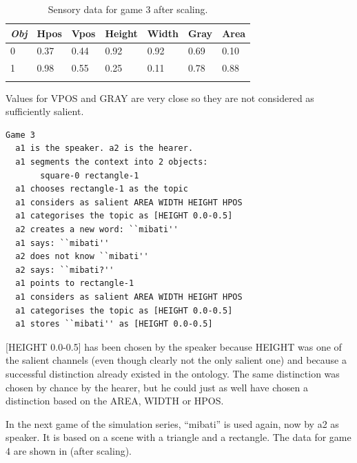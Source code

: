 \begin{table}
\begin{center}
\begin{tabular}{ l  l  l  l  l  l  l }
\lsptoprule
{\itshape Obj} & Hpos & Vpos & Height & Width & Gray & Area \\ \midrule
0 & 0.37 & 0.44 & 0.92 & 0.92 & 0.69 & 0.10\\ 
1 & 0.98 & 0.55 & 0.25 & 0.11 & 0.78 & 0.88\\ 
\lspbottomrule
\end{tabular}
\caption{\label{tab:game3} Sensory data for game 3 after scaling.}
\end{center}
\end{table}
Values for VPOS and GRAY are very close so they are not 
considered as sufficiently salient.
\begin{verbatim}
Game 3
  a1 is the speaker. a2 is the hearer. 
  a1 segments the context into 2 objects: 
       square-0 rectangle-1 
  a1 chooses rectangle-1 as the topic 
  a1 considers as salient AREA WIDTH HEIGHT HPOS 
  a1 categorises the topic as [HEIGHT 0.0-0.5]
  a2 creates a new word: ``mibati''
  a1 says: ``mibati''
  a2 does not know ``mibati''
  a2 says: ``mibati?''
  a1 points to rectangle-1
  a1 considers as salient AREA WIDTH HEIGHT HPOS 
  a1 categorises the topic as [HEIGHT 0.0-0.5]
  a1 stores ``mibati'' as [HEIGHT 0.0-0.5]
\end{verbatim}
{}[HEIGHT 0.0-0.5] has been chosen by the speaker
because HEIGHT was one of the salient channels (even 
though clearly not the only salient one) and 
because a successful distinction already existed in 
the ontology. The same 
distinction was chosen by chance by the hearer, but he 
could just as well have chosen a distinction based on 
the AREA, WIDTH or HPOS. 

In the next game of the simulation series, ``mibati''
is used again, now by {\bfshape  a2} as speaker. It is 
based on a scene with a triangle and a rectangle.
The data for game 4 are shown in  (after scaling).  


